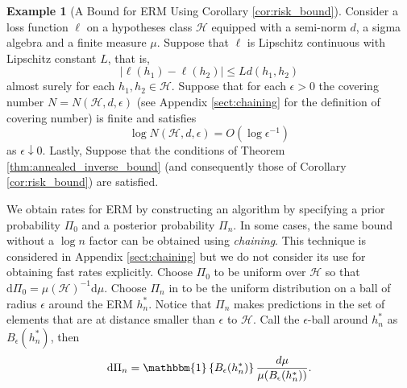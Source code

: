 \documentclass{uvamath}
\newcommand*{\calH}{\mathcal{H}}
\newcommand*{\indicator}[1]{\mathbbm{1}\left\{#1\right\}}
\newcommand*{\rmd}{\mathrm{d}}
\theoremstyle{remark}
\theoremstyle{definition}
\theoremstyle{definition}
\theoremstyle{definition}
\newtheorem{example}[theorem]{Example}
\theoremstyle{definition}
\theoremstyle{definition}
\begin{document}
\begin{example}[A Bound for ERM Using Corollary \ref{cor:risk_bound}]
  \label{ex:risk_bound_with_zhang}
  Consider a loss function $\ell$ on a hypotheses class $\calH$
  equipped with a semi-norm $d$, a sigma algebra and a finite measure
  $\mu$. Suppose that $\ell$ is Lipschitz continuous with Lipschitz
  constant $L$, that is,
  \begin{equation*}
    |\ell(h_1) - \ell(h_2)|\leq Ld(h_1, h_2)
  \end{equation*}
  almost surely for each $h_1,h_2\in\calH$. Suppose that for each
  $\epsilon>0$ the covering number $N = N( \calH, d, \epsilon)$ (see
  Appendix \ref{sect:chaining} for the definition of covering number)
  is finite and satisfies
  \begin{equation*}
    \log N( \calH, d, \epsilon) = O(\log\epsilon^{-1})
  \end{equation*}
  as $\epsilon\downarrow 0$. Lastly, Suppose that the conditions of
  Theorem \ref{thm:annealed_inverse_bound} (and consequently those of
  Corollary \ref{cor:risk_bound}) are satisfied.

  We obtain rates for ERM by constructing an algorithm by specifying a
  prior probability $\Pi_0$ and a posterior probability $\Pi_n$. In
  some cases, the same bound without a $\log n$ factor can be obtained
  using \textit{chaining}. This technique is considered in Appendix
  \ref{sect:chaining} but we do not consider its use for obtaining fast
  rates explicitly. Choose $\Pi_0$ to be uniform over $\calH$ so that
  $\rmd\Pi_0 =\mu(\calH)^{-1}\rmd\mu$.  Choose $\Pi_n$ in to be the
  uniform distribution on a ball of radius $\epsilon$ around the ERM
  $h^*_n$. Notice that $\Pi_n$ makes predictions in the set of
  elements that are at distance smaller than $\epsilon$ to
  $\calH$. Call the $\epsilon$-ball around $h^*_{n}$ as
  $B_\epsilon(h^*_{n})$, then
  $$\rmd\Pi_n =
  \indicator{B_\epsilon(h^*_{n})}\frac{d\mu}{\mu(B_\epsilon(h^*_{n}))}.$$



\end{example}
\end{document}
